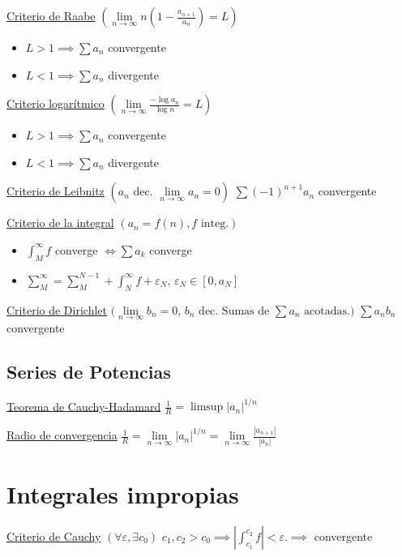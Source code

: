 \documentclass[12pt]{article}
\newcommand{\abs}[1]{\left\vert #1 \right\vert}
\begin{document}
\begin{multicols}{3}
\underline{Criterio de Raabe}
$\left( \lim\limits_{n \to \infty} n \left(1 - \frac{a_{n+1}}{a_n}\right)= L \right)$
\begin{itemize}
	\item $L > 1 \implies \sum a_n$ convergente
	\item $L < 1 \implies \sum a_n$ divergente
\end{itemize}

\underline{Criterio logarítmico}
$\left( \lim\limits_{n \to \infty} \frac{-\log{a_n}}{\log{n}} = L \right)$
\begin{itemize}
	\item $L > 1 \implies \sum a_n$ convergente
	\item $L < 1 \implies \sum a_n$ divergente
\end{itemize}

\underline{Criterio de Leibnitz} $\left( a_n \text{ dec. } \lim\limits_{n \to \infty}
a_n = 0 \right)$
$\sum (-1)^{n+1} a_n$ convergente

\underline{Criterio de la integral} $\left( a_n = f(n), f \text{ integ.} \right)$
\begin{itemize}
	\item $\int_{M}^{\infty} f$ converge $\iff \sum a_k$ converge
	\item $\sum\limits_{M}^{\infty} = \sum\limits_{M}^{N-1} + \int_{N}^{\infty} f
	+ \varepsilon_N$, $\varepsilon_N \in [0,a_N]$
\end{itemize}

\underline{Criterio de Dirichlet} $(\lim\limits_{n\to \infty} b_n = 0$, $b_n \text{ dec. Sumas de } \sum a_n
\text{ acotadas.})$
$\sum a_nb_n$ convergente

\subsection{Series de Potencias}

\underline{Teorema de Cauchy-Hadamard}
$\frac{1}{R} = \limsup \abs{a_n}^{1/n}$

\underline{Radio de convergencia}
$\frac{1}{R} = \lim\limits_{n \to \infty} \abs{a_n}^{1/n} = 
\lim\limits_{n \to \infty} \frac{\abs{a_{n+1}}}{\abs{a_n}}$

\section{Integrales impropias}

\underline{Criterio de Cauchy} $\left( \forall \varepsilon, \exists c_0 \right)$
$c_1, c_2 > c_0 \implies \abs{\int_{c_1}^{c_2} f} < \varepsilon. \implies$ convergente



\end{multicols}
\end{document}
